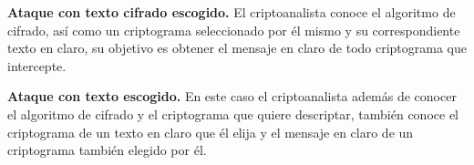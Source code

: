\textbf{Ataque con texto cifrado escogido. }
El criptoanalista conoce el algoritmo de cifrado, así como un criptograma seleccionado por él mismo y su correspondiente texto en claro, su objetivo es obtener el mensaje en claro de todo criptograma que intercepte.

\textbf{Ataque con texto escogido. }
En este caso el criptoanalista además de conocer el algoritmo de cifrado y el criptograma que quiere descriptar, también conoce el criptograma de un texto en claro que él elija y el mensaje en claro de un criptograma también elegido por él.





